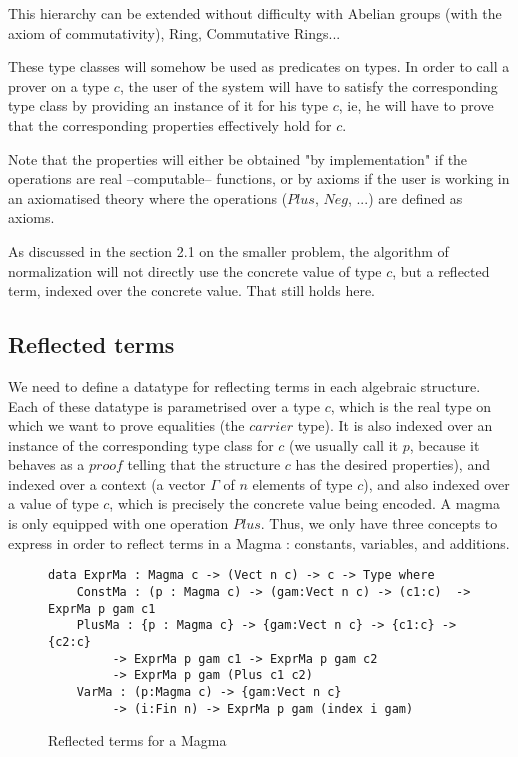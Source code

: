This hierarchy can be extended without difficulty with Abelian groups (with the axiom of commutativity), Ring, Commutative Rings...

These type classes will somehow be used as predicates on types. In order to call a prover on a type $c$, the user of the system will have to satisfy the corresponding type class by providing an instance of it for his type $c$, ie, he will have to prove that the corresponding properties effectively hold for $c$.

Note that the properties will either be obtained "by implementation" if the operations are real --computable-- functions, or by axioms if the user is working in an axiomatised theory where the operations ($Plus$, $Neg$, ...) are defined as axioms.

As discussed in the section 2.1 on the smaller problem, the algorithm of normalization will not directly use the concrete value of type $c$, but a reflected term, indexed over the concrete value. That still holds here.


	\subsection {Reflected terms}

We need to define a datatype for reflecting terms in each algebraic structure.
Each of these datatype is parametrised over a type $c$, which is the real type on which we want to prove equalities (the $carrier$ type). It is also indexed over an instance of the corresponding type class for $c$ (we usually call it $p$, because it behaves as a $proof$ telling that the structure $c$ has the desired properties), and indexed over a context (a vector $\Gamma$ of $n$ elements of type $c$), and also indexed over a value of type $c$, which is precisely the concrete value being encoded.
A magma is only equipped with one operation $Plus$. Thus, we only have three concepts to express in order to reflect terms in a Magma : constants, variables, and additions.



\begin{figure}[H]
\figrule
\begin{center}
\begin{verbatim}
data ExprMa : Magma c -> (Vect n c) -> c -> Type where
    ConstMa : (p : Magma c) -> (gam:Vect n c) -> (c1:c)  -> ExprMa p gam c1 
    PlusMa : {p : Magma c} -> {gam:Vect n c} -> {c1:c} -> {c2:c} 
         -> ExprMa p gam c1 -> ExprMa p gam c2 
         -> ExprMa p gam (Plus c1 c2) 
    VarMa : (p:Magma c) -> {gam:Vect n c}
         -> (i:Fin n) -> ExprMa p gam (index i gam)
\end{verbatim}
\end{center}
\caption{Reflected terms for a Magma}
\figrule
\end{figure}

